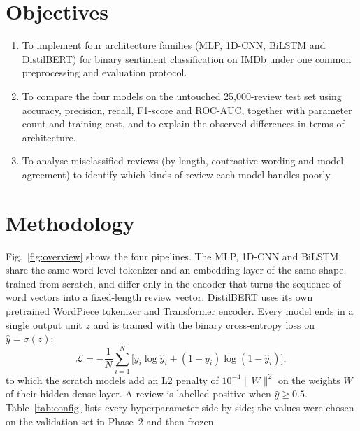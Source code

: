 \documentclass[conference,onecolumn,a4paper,10pt]{IEEEtran}
\begin{document}
\section{Objectives}
\begin{enumerate}
\item To implement four architecture families (MLP, 1D-CNN, BiLSTM and DistilBERT) for binary sentiment classification on IMDb under one common preprocessing and evaluation protocol.
\item To compare the four models on the untouched 25,000-review test set using accuracy, precision, recall, F1-score and ROC-AUC, together with parameter count and training cost, and to explain the observed differences in terms of architecture.
\item To analyse misclassified reviews (by length, contrastive wording and model agreement) to identify which kinds of review each model handles poorly.
\end{enumerate}

\section{Methodology}
Fig.~\ref{fig:overview} shows the four pipelines. The MLP, 1D-CNN and BiLSTM share the same word-level tokenizer and an embedding layer of the same shape, trained from scratch, and differ only in the encoder that turns the sequence of word vectors into a fixed-length review vector. DistilBERT uses its own pretrained WordPiece tokenizer and Transformer encoder. Every model ends in a single output unit $z$ and is trained with the binary cross-entropy loss on $\hat{y}=\sigma(z)$:
\begin{equation}
\mathcal{L} = -\frac{1}{N}\sum_{i=1}^{N}\big[y_i\log\hat{y}_i + (1-y_i)\log(1-\hat{y}_i)\big],
\end{equation}
to which the scratch models add an L2 penalty of $10^{-4}\lVert W\rVert^2$ on the weights $W$ of their hidden dense layer. A review is labelled positive when $\hat{y}\ge 0.5$. Table~\ref{tab:config} lists every hyperparameter side by side; the values were chosen on the validation set in Phase~2 and then frozen.
\end{document}
